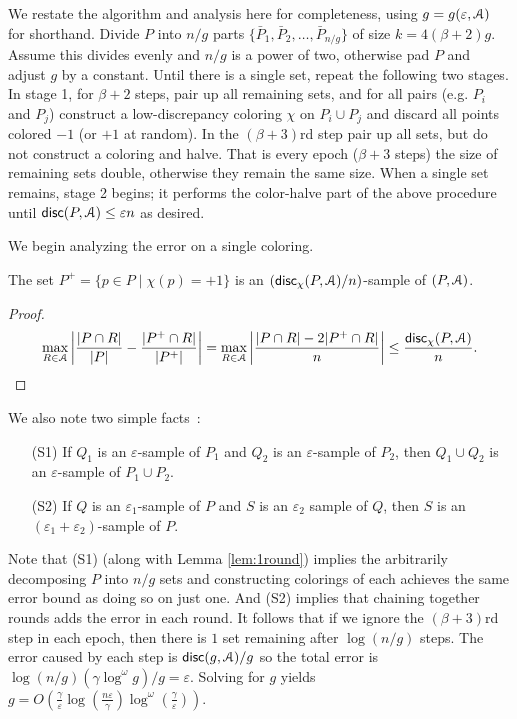 \documentclass[11pt]{myclass}
\newcommand{\eps}{\varepsilon}
\newcommand{\Eu}[1]{\ensuremath{\EuScript{#1}}}
\newcommand{\disc}{\textsf{disc}}
\begin{document}
We restate the algorithm and analysis here for completeness, using $g = g(\eps,\Eu{A})$ for shorthand.  
Divide $P$ into $n/g$ parts $\{\bar P_1, \bar P_2, \ldots, \bar P_{n/g}\}$ of size $k = 4(\beta + 2) g$.  Assume this divides evenly and $n/g$ is a power of two, otherwise pad $P$ and adjust $g$ by a constant.  
Until there is a single set, repeat the following two stages.  
In stage 1, for $\beta+2$ steps, pair up all remaining sets, and for all pairs (e.g. $P_i$ and $P_j$) construct a low-discrepancy coloring $\chi$ on $P_i \cup P_j$ and discard all points colored $-1$ (or $+1$ at random).  In the $(\beta+3)$rd step pair up all sets, but do not construct a coloring and halve.  
That is every epoch ($\beta+3$ steps) the size of remaining sets double, otherwise they remain the same size.  
When a single set remains, stage 2 begins; it performs the color-halve part of the above procedure until $\disc(P,\Eu{A}) \leq \eps n$ as desired.  

We begin analyzing the error on a single coloring.  
\begin{lemma}
The set $P^+ = \{p \in P \mid \chi(p) = +1\}$ is an $(\disc_\chi(P,\Eu{A})/n)$-sample of $(P,\Eu{A})$.  
\label{lem:1round}
\end{lemma}
\begin{proof}
\begin{align*}
\max_{R \in \Eu{A}} \left| \frac{|P \cap R|}{|P|} - \frac{|P^+ \cap R|}{|P^+|} \right| 
= 
\max_{R \in \Eu{A}} \left| \frac{|P \cap R| - 2 |P^+ \cap R|}{n} \right| 
 \leq
\frac{\disc_\chi(P,\Eu{A})}{n}. 
\end{align*}
\end{proof}
We also note two simple facts~\cite{Cha01,Mat99}:
\begin{itemize}
\item[(S1)] If $Q_1$ is an $\eps$-sample of $P_1$ and $Q_2$ is an $\eps$-sample of $P_2$, then $Q_1 \cup Q_2$ is an $\eps$-sample of $P_1 \cup P_2$.  
\item[(S2)] If $Q$ is an $\eps_1$-sample of $P$ and $S$ is an $\eps_2$ sample of $Q$, then $S$ is an $(\eps_1+\eps_2)$-sample of $P$.  
\end{itemize}
Note that (S1) (along with Lemma \ref{lem:1round}) implies the arbitrarily decomposing $P$ into $n/g$ sets and constructing colorings of each achieves the same error bound as doing so on just one.  And (S2) implies that chaining together rounds adds the error in each round.  
It follows that if we ignore the $(\beta+3)$rd step in each epoch, then there is $1$ set remaining after $\log (n/g)$ steps.  The error caused by each step is $\disc(g,\Eu{A})/g$ so the total error is $\log (n/g) (\gamma \log^\omega g)/g = \eps$.  Solving for $g$ yields
$g = O(\frac{\gamma}{\eps} \log (\frac{n \eps}{\gamma}) \log^\omega(\frac{\gamma}{\eps}))$.  
\end{document}
